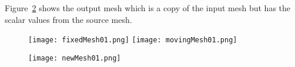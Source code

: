 \documentclass{InsightArticle}
\begin{document}
Figure~\ref{fig:OutputMeshes} shows the output mesh which is a copy of the input mesh but
has the scalar values from the source mesh.

\begin{figure}
\center
\texttt{[image: fixedMesh01.png]}
\texttt{[image: movingMesh01.png]}
\label{fig:InputMeshes}
\end{figure}

\begin{figure}
\center
\texttt{[image: newMesh01.png]}
\label{fig:OutputMeshes}
\end{figure}

\clearpage

%
%



\end{document}
